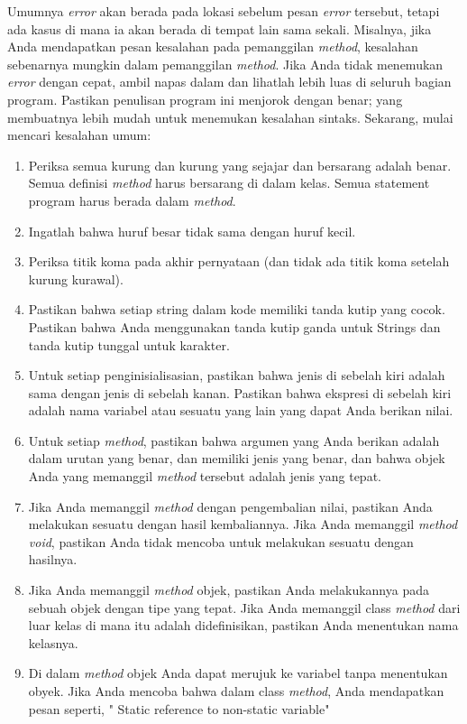 Umumnya \textit{error} akan berada pada lokasi sebelum pesan \textit{error} tersebut, tetapi ada kasus di mana ia akan berada di tempat lain sama sekali. Misalnya, jika Anda mendapatkan pesan kesalahan pada pemanggilan \textit{method}, kesalahan sebenarnya mungkin dalam pemanggilan \textit{method}.
Jika Anda tidak menemukan \textit{error} dengan cepat, ambil napas dalam dan lihatlah lebih luas di seluruh bagian program. Pastikan penulisan program ini menjorok dengan benar; yang membuatnya lebih mudah untuk menemukan kesalahan sintaks.
Sekarang, mulai mencari kesalahan umum:
\begin{enumerate}
    \item Periksa semua kurung dan kurung yang sejajar dan bersarang adalah benar. Semua definisi \textit{method} harus bersarang di dalam kelas. Semua statement program harus berada dalam \textit{method}.
    \item Ingatlah bahwa huruf besar tidak sama dengan huruf kecil.
    \item Periksa titik koma pada akhir pernyataan (dan tidak ada titik koma setelah kurung kurawal).
    \item Pastikan bahwa setiap string dalam kode memiliki tanda kutip yang cocok. Pastikan bahwa Anda menggunakan tanda kutip ganda untuk Strings dan tanda kutip tunggal untuk karakter.
    \item Untuk setiap penginisialisasian, pastikan bahwa jenis di sebelah kiri adalah sama dengan jenis di sebelah kanan. Pastikan bahwa ekspresi di sebelah kiri adalah nama variabel atau sesuatu yang lain yang dapat Anda berikan nilai.
    \item Untuk setiap \textit{method}, pastikan bahwa argumen yang Anda berikan adalah dalam urutan yang benar, dan memiliki jenis yang benar, dan bahwa objek Anda yang memanggil \textit{method} tersebut adalah jenis yang tepat.
    \item Jika Anda memanggil \textit{method} dengan pengembalian nilai, pastikan Anda melakukan sesuatu dengan hasil kembaliannya. Jika Anda memanggil \textit{method void}, pastikan Anda tidak mencoba untuk melakukan sesuatu dengan hasilnya.
    \item Jika Anda memanggil \textit{method} objek, pastikan Anda melakukannya pada sebuah objek dengan tipe yang tepat. Jika Anda memanggil class \textit{method} dari luar kelas di mana itu adalah didefinisikan, pastikan Anda menentukan nama kelasnya.
    \item Di dalam \textit{method} objek Anda dapat merujuk ke variabel tanpa menentukan obyek. Jika Anda mencoba bahwa dalam class \textit{method}, Anda mendapatkan pesan seperti, " Static reference to non-static variable" 
\end{enumerate}

